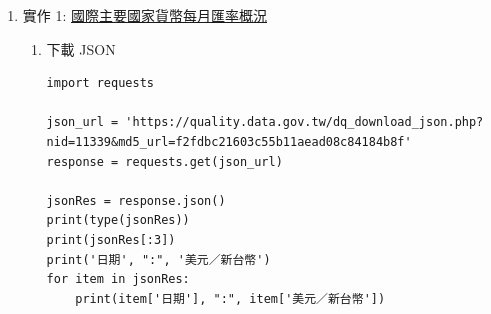 \documentclass[a4paper,12pt]{article}
\begin{document}
\begin{enumerate}
\begin{itemize}
\item 範例 1\\
\end{itemize}
\lstset{breaklines=true,language=Python,label= ,caption= ,captionpos=b,firstnumber=1,numbers=left}
\begin{lstlisting}
{
    "id": 1,
    "name": "Jamees, Yen",
    "price": 19,
    "gender": "M",
    "hobby": ["music", "programming"]
}
\end{lstlisting}

\begin{itemize}
\item 範例 2\\
\end{itemize}
\lstset{breaklines=true,language=Python,label= ,caption= ,captionpos=b,firstnumber=1,numbers=left}
\begin{lstlisting}
{
    "id": 382192
    "name": "Jamees, Yen",
    "price": 19,
    "gender": "M",
    "exams": [
        { "title": "期中考",
          "chinese": 85,
          "math": 98,
          "englihs": 92
        },
        { "title": "期末考",
          "chinese": 81,
          "math": 92,
          "englihs": 97
        }
    ],
    "hobby": ["music", "programming"]
}
\end{lstlisting}

\item 實作 1: \href{https://data.gov.tw/dataset/31897}{國際主要國家貨幣每月匯率概況}
\label{sec:orgdd16fed}
\begin{enumerate}
\item 下載 JSON
\label{sec:orgdae87b7}
\lstset{breaklines=true,language=Python,label= ,caption= ,captionpos=b,firstnumber=1,numbers=left}
\begin{lstlisting}
import requests

json_url = 'https://quality.data.gov.tw/dq_download_json.php?nid=11339&md5_url=f2fdbc21603c55b11aead08c84184b8f'
response = requests.get(json_url)

jsonRes = response.json()
print(type(jsonRes))
print(jsonRes[:3])
print('日期', ":", '美元／新台幣')
for item in jsonRes:
    print(item['日期'], ":", item['美元／新台幣'])
\end{lstlisting}


\end{enumerate}
\end{enumerate}
\end{document}
